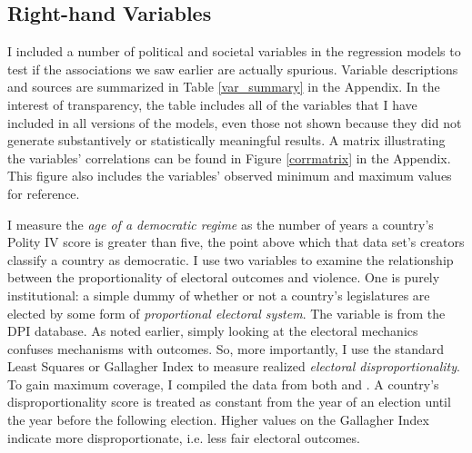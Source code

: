 \documentclass[a4paper]{article}\usepackage[]{graphicx}\usepackage[]{color}
\begin{document}
\subsection{Right-hand Variables}

I included a number of political and societal variables in the regression models to test if the associations we saw earlier are actually spurious. Variable descriptions and sources are summarized in Table \ref{var_summary} in the Appendix. In the interest of transparency, the table includes all of the variables that I have included in all versions of the models, even those not shown because they did not generate substantively or statistically meaningful results. A matrix illustrating the variables' correlations can be found in Figure \ref{corrmatrix} in the Appendix. This figure also includes the variables' observed minimum and maximum values for reference. 

I measure the {\emph{age of a democratic regime}} as the number of years a country's Polity IV score is greater than five, the point above which that data set's creators classify a country as democratic. I use two variables to examine the relationship between the proportionality of electoral outcomes and violence. One is purely institutional: a simple dummy of whether or not a country's legislatures are elected by some form of {\emph{proportional electoral system}}. The variable is from the DPI database. As noted earlier, simply looking at the electoral mechanics confuses mechanisms with outcomes. So, more importantly, I use the standard Least Squares or Gallagher Index \citep{Gallagher1991} to measure realized {\emph{electoral disproportionality}}. To gain maximum coverage, I compiled the data from both \cite{Gallagher2012} and \cite{Carey2011}. A country's disproportionality score is treated as constant from the year of an election until the year before the following election. Higher values on the Gallagher Index indicate more disproportionate, i.e. less fair electoral outcomes. 
\end{document}
